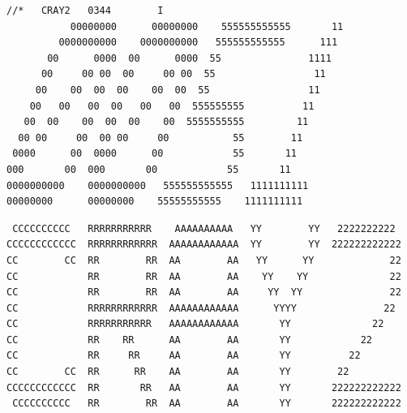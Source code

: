 
{\scriptsize
\begin{verbatim}
//*   CRAY2   0344        I
           00000000      00000000    555555555555       11
         0000000000    0000000000   555555555555      111
       00      0000  00      0000  55               1111
      00     00 00  00     00 00  55                 11
     00    00  00  00    00  00  55                 11
    00   00   00  00   00   00  555555555          11
   00  00    00  00  00    00  5555555555         11
  00 00     00  00 00     00           55        11
 0000      00  0000      00            55       11
000       00  000       00            55       11
0000000000    0000000000   555555555555   1111111111
00000000      00000000    55555555555    1111111111
\end{verbatim}
}


\handwritten{\[
\begin{aligned}\sigma(x,y)&=x-y\\(1+\sigma)(x,y)&=2x\\(1\deleted{\unsure{+}}-\sigma)(x,y)&=2y\end{aligned}
\]}

\handwritten{\[
\begin{aligned}
&\deleted{\unsure{1+2|1+}}\\
&\deleted{\unsure{\forall x\in P,\ \exists\,2y\in M'\!Q|\forall x\in P,\ \exists\,y\in M'|\exists\,x,y\in M'},\ (1+\sigma)(x,y)=x\quad\text{i.e. }2x}\\
&P=\quad\deleted{x\in\ (x,y)\in M'}\\
&\deleted{(x,y)}\,x+2y\in M'
\end{aligned}
\]}

\handwritten{\[
\left\{\begin{aligned}M'\cap P&=2P\\M'\cap Q&=2Q\end{aligned}\right.
\qquad\text{i.e. }\underset{=(M'\cap P)+2Q}{\underbrace{M'\cap(P+2Q)}}=2P+2Q
\]}

{\scriptsize
\begin{verbatim}
 CCCCCCCCCC   RRRRRRRRRRR    AAAAAAAAAA   YY        YY   2222222222
CCCCCCCCCCCC  RRRRRRRRRRRR  AAAAAAAAAAAA  YY        YY  222222222222
CC        CC  RR        RR  AA        AA   YY      YY             22
CC            RR        RR  AA        AA    YY    YY              22
CC            RR        RR  AA        AA     YY  YY               22
CC            RRRRRRRRRRRR  AAAAAAAAAAAA      YYYY               22
CC            RRRRRRRRRRR   AAAAAAAAAAAA       YY              22
CC            RR    RR      AA        AA       YY            22
CC            RR     RR     AA        AA       YY          22
CC        CC  RR      RR    AA        AA       YY        22
CCCCCCCCCCCC  RR       RR   AA        AA       YY       222222222222
 CCCCCCCCCC   RR        RR  AA        AA       YY       222222222222
\end{verbatim}
}


